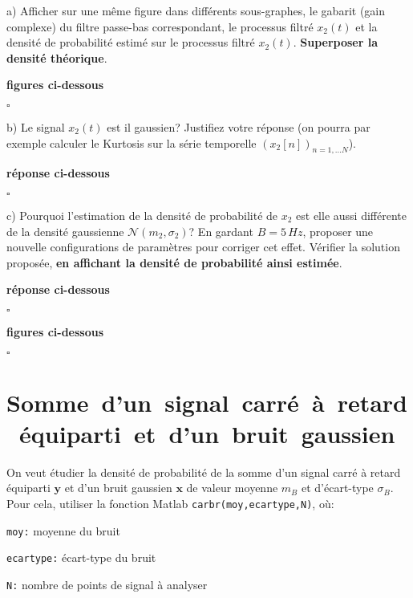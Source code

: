 \documentclass{article}
\newcommand{\debutrep}[1]{\color{blue}\begin{center} \hrulefill \textbf{ #1 } \hrulefill \end{center} }
\newcommand{\finrep}{\vspace*{5mm}\hfill $\square$\color{black}\vspace*{5mm}}
\begin{document}
\begin{list}{}{\setlength{\leftmargin}{6mm} \setlength{\labelwidth}{20mm} \setlength{\labelsep}{2mm} \setlength{\itemsep}{1mm} }

\item[a)]  Afficher  sur une même figure dans différents sous-graphes, le gabarit (gain complexe) du filtre passe-bas correspondant, le processus filtré $x_2(t)$  et la densité de probabilité estimé sur le processus filtré $x_2(t)$. \textbf{Superposer la densité théorique}.

\debutrep{figures ci-dessous}

\finrep


\item[b)]  Le signal $x_2(t)$ est il gaussien? Justifiez votre réponse (on pourra par exemple calculer le Kurtosis sur la série temporelle $\left(x_2[n]\right)_{n=1,\ldots N}$).

\debutrep{réponse ci-dessous}

\finrep

 
\item[c)] Pourquoi l'estimation de la densité de probabilité de $x_2$ est elle aussi différente de la densité gaussienne $\mathcal{N}(m_2,\sigma_2)$? En gardant  $B=5\,Hz$, proposer une nouvelle configurations de paramètres pour corriger cet effet. Vérifier la solution proposée, \textbf{en affichant la densité de probabilité ainsi estimée}.

\debutrep{réponse ci-dessous}

\finrep

\debutrep{figures ci-dessous}

\finrep


\end{list}

\clearpage 
\section{\mbox{Somme d'un signal carré à retard équiparti et d'un bruit gaussien}}

On veut étudier la densité de probabilité de la somme d'un signal carré à retard équiparti $\mathbf{y}$ et d'un bruit gaussien  $\mathbf{x}$ de valeur moyenne $m_B$ et d'écart-type $\sigma_B$.\\

Pour cela, utiliser la fonction Matlab {\tt carbr(moy,ecartype,N)}, où:
\begin{list}{}{\setlength{\leftmargin}{20mm} \setlength{\labelwidth}{20mm} \setlength{\labelsep}{3mm} \setlength{\itemsep}{1mm} }
\item[{\tt moy:}] moyenne du bruit
\item[{\tt ecartype:}] écart-type du bruit
\item[{\tt N:}] nombre de points de signal à analyser
\end{list}
\end{document}

